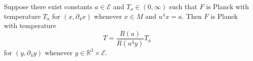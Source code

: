 Suppose there exist constants $a \in \mathcal{E}$ and $T_a \in (0, \infty)$ such that $F$ is Planck with temperature $T_a$ for $(x, \partial_4 x)$ whenever $x \in M$ and $u^4 x = a$. Then $F$ is Planck with temperature
$$
T = \frac{R(a)}{R(u^4 y)} T_a
$$
for $(y, \partial_4 y)$ whenever $y \in \mathbb{R}^3 \times \mathcal{E}$.
